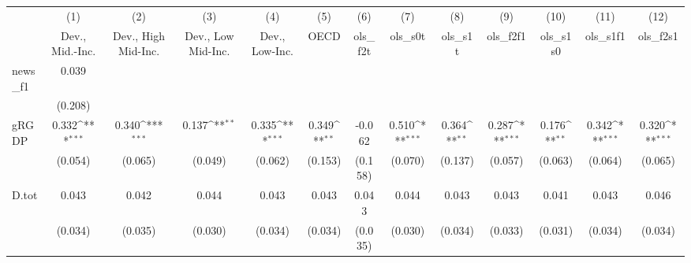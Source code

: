 {
\def\sym#1{\ifmmode^{#1}\else\(^{#1}\)\fi}
\begin{tabular}{l*{12}{c}}
\toprule
            &\multicolumn{1}{c}{(1)}&\multicolumn{1}{c}{(2)}&\multicolumn{1}{c}{(3)}&\multicolumn{1}{c}{(4)}&\multicolumn{1}{c}{(5)}&\multicolumn{1}{c}{(6)}&\multicolumn{1}{c}{(7)}&\multicolumn{1}{c}{(8)}&\multicolumn{1}{c}{(9)}&\multicolumn{1}{c}{(10)}&\multicolumn{1}{c}{(11)}&\multicolumn{1}{c}{(12)}\\
            &\multicolumn{1}{c}{Dev., Mid.-Inc.}&\multicolumn{1}{c}{Dev., High Mid-Inc.}&\multicolumn{1}{c}{Dev., Low Mid-Inc.}&\multicolumn{1}{c}{Dev., Low-Inc.}&\multicolumn{1}{c}{OECD}&\multicolumn{1}{c}{ols\_f2t}&\multicolumn{1}{c}{ols\_s0t}&\multicolumn{1}{c}{ols\_s1t}&\multicolumn{1}{c}{ols\_f2f1}&\multicolumn{1}{c}{ols\_s1s0}&\multicolumn{1}{c}{ols\_s1f1}&\multicolumn{1}{c}{ols\_f2s1}\\
\midrule
news\_f1     &       0.039         &                     &                     &                     &                     &                     &                     &                     &                     &                     &                     &                     \\
            &     (0.208)         &                     &                     &                     &                     &                     &                     &                     &                     &                     &                     &                     \\
\addlinespace
gRGDP       &       0.332\sym{***}&       0.340\sym{***}&       0.137\sym{**} &       0.335\sym{***}&       0.349\sym{**} &      -0.062         &       0.510\sym{***}&       0.364\sym{**} &       0.287\sym{***}&       0.176\sym{**} &       0.342\sym{***}&       0.320\sym{***}\\
            &     (0.054)         &     (0.065)         &     (0.049)         &     (0.062)         &     (0.153)         &     (0.158)         &     (0.070)         &     (0.137)         &     (0.057)         &     (0.063)         &     (0.064)         &     (0.065)         \\
\addlinespace
D.tot       &       0.043         &       0.042         &       0.044         &       0.043         &       0.043         &       0.043         &       0.044         &       0.043         &       0.043         &       0.041         &       0.043         &       0.046         \\
            &     (0.034)         &     (0.035)         &     (0.030)         &     (0.034)         &     (0.034)         &     (0.035)         &     (0.030)         &     (0.034)         &     (0.033)         &     (0.031)         &     (0.034)         &     (0.034)         \\

\end{tabular}}
